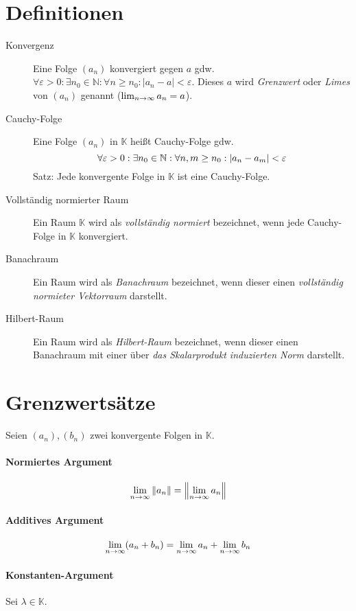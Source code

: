 	\section{Definitionen}
		\begin{description}
			\item[Konvergenz] Eine Folge $ (a _ n) $ konvergiert gegen $ a $ gdw. $ \forall \varepsilon > 0 : \exists n _ 0 \in \mathbb{N} : \forall n \geq n _ 0 : \lvert a _ n - a \rvert < \varepsilon $. Dieses $ a $ wird \textit{Grenzwert} oder \textit{Limes} von $ (a _ n) $ genannt ($ \lim_{n \to \infty} a _ n = a $).
			\item[Cauchy-Folge] Eine Folge $ (a _ n) $ in $ \mathbb{K} $ heißt Cauchy-Folge gdw. \[ \forall \varepsilon > 0 : \exists n _ 0 \in \mathbb{N} : \forall n, m \geq n _ 0 : \abs{a _ n - a _ m} < \varepsilon \] Satz: Jede konvergente Folge in $ \mathbb{K} $ ist eine Cauchy-Folge.
			\item[Vollständig normierter Raum] Ein Raum $ \mathbb{K} $ wird als \textit{vollständig normiert} bezeichnet, wenn jede Cauchy-Folge in $ \mathbb{K} $ konvergiert.
			\item[Banachraum] Ein Raum wird als \textit{Banachraum} bezeichnet, wenn dieser einen \textit{vollständig normieter Vektorraum} darstellt.
			\item[Hilbert-Raum] Ein Raum wird als \textit{Hilbert-Raum} bezeichnet, wenn dieser einen Banachraum mit einer über \textit{das Skalarprodukt induzierten Norm} darstellt.
		\end{description}

	\section{Grenzwertsätze}
		Seien $ (a _ n), (b _ n) $ zwei konvergente Folgen in $ \mathbb{K} $.

		\paragraph{Normiertes Argument}
			\[ \lim_{n \to \infty} \norm{a _ n} = \norm{\lim_{n \to \infty} a _ n} \]

		\paragraph{Additives Argument}
			\[ \lim_{n \to \infty} (a _ n + b _ n) = \lim_{n \to \infty} a _ n + \lim_{n \to \infty} b _ n \]

		\paragraph{Konstanten-Argument}
			Sei $ \lambda \in \mathbb{K} $.

